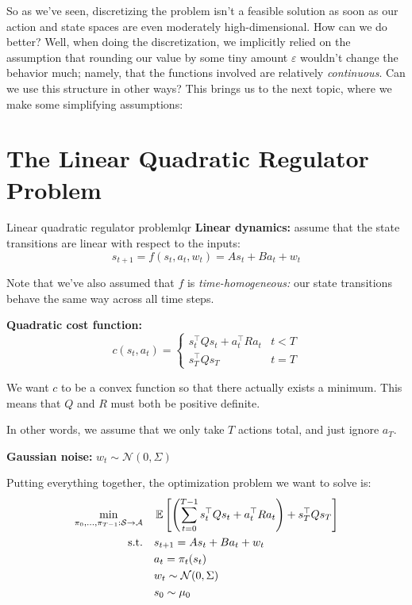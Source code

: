 \documentclass[../main/main]{subfiles}
\begin{document}
So as we've seen, discretizing the problem isn't a feasible solution as soon as
our action and state spaces are even moderately high-dimensional.
How can we do better?
Well, when doing the discretization, we implicitly relied on the assumption
that rounding our value by some tiny amount $\varepsilon$ wouldn't change the
behavior much; namely, that the functions involved are relatively
\emph{continuous}.
Can we use this structure in other ways? This brings us to the next topic,
where we make some simplifying assumptions:

\section{The Linear Quadratic Regulator Problem}



\begin{definition}{Linear quadratic regulator problem}{lqr}
    \textbf{Linear dynamics:} assume that the state transitions are linear with
    respect to the inputs: \[
        s_{t+1} = f(s_t, a_t, w_t) = A s_t + B a_t + w_t
    \]

    Note that we've also assumed that $f$ is \emph{time-homogeneous:} our
    state transitions behave the same way across all time steps.

    \textbf{Quadratic cost function:} \[
        c(s_t, a_t) = \begin{cases}
            s_t^\top Q s_t + a_t^\top R a_t & t < T \\
            s_T^\top Q s_T & t = T
        \end{cases}
    \]

    We want $c$ to be a convex function so that there actually exists
    a minimum. This means that $Q$ and $R$ must both be positive definite.

    In other words, we assume that we only take $T$ actions total, and just ignore $a_T$.

    \textbf{Gaussian noise:} $w_t \sim \mathcal{N}(0, \Sigma)$

    Putting everything together, the optimization problem we want to solve is:
    \begin{align*}
        \min_{\pi_0, \dots, \pi_{T-1} : \mathcal{S} \to \mathcal{A}} \quad & \operatorname*{\mathbb{E}} \left[ \left( \sum_{t=0}^{T-1} s_t^\top Q s_t + a_t^\top R a_t \right) + s_T^\top Q s_T \right] \\
        \textrm{s.t.} \quad & s_{t+1} = A s_t + B a_t + w_t \\
        & a_t = \pi_t (s_t) \\
        & w_t \sim \mathcal{N}(0, \Sigma) \\
        & s_0 \sim \mu_0
    \end{align*}
\end{definition}
\end{document}
